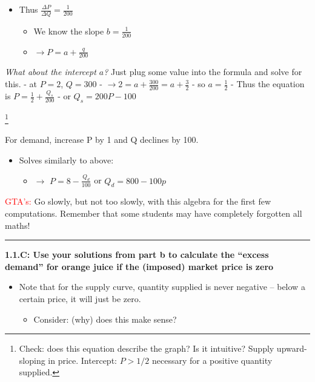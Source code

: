 \documentclass[]{article}
\providecommand{\tightlist}{%
  \setlength{\itemsep}{0pt}\setlength{\parskip}{0pt}}
\let\rmarkdownfootnote\footnote%
\def\footnote{\protect\rmarkdownfootnote}
\begin{document}
\begin{itemize}
\tightlist
\item
  Thus \(\frac{\Delta P}{\Delta Q} = \frac{1}{200}\)

  \begin{itemize}
  \tightlist
  \item
    We know the slope \(b=\frac{1}{200}\)
  \item
    \(\rightarrow P = a + \frac{q}{200}\)
  \end{itemize}
\end{itemize}

\emph{What about the intercept \(a\)?} Just plug some value into the
formula and solve for this. - at \(P=2\), \(Q=300\) -
\(\rightarrow 2 = a + \frac{300}{200} = a + \frac{3}{2}\) - so
\(a = \frac{1}{2}\) - Thus the equation is
\(P = \frac{1}{2} + \frac{Q_s}{200}\) - or \(Q_s=200P-100\)

\footnote{Check: does this equation describe the graph? Is it intuitive? Supply upward-sloping in price. Intercept: $P>1/2$ necessary for a positive quantity supplied.}

For demand, increase P by 1 and Q declines by 100.

\begin{itemize}
\tightlist
\item
  Solves similarly to above:

  \begin{itemize}
  \tightlist
  \item
    \(\rightarrow\) \(P=8-\frac{Q_d}{100}\) or \(Q_d=800-100p\)
  \end{itemize}
\end{itemize}

\textcolor{red}{GTA's:} Go slowly, but not too slowly, with this algebra
for the first few computations. Remember that some students may have
completely forgotten all maths!

\begin{center}\rule{0.5\linewidth}{\linethickness}\end{center}

\textbf{1.1.C: Use your solutions from part b to calculate the ``excess
demand'' for orange juice if the (imposed) market price is zero}

\begin{itemize}
\tightlist
\item
  Note that for the supply curve, quantity supplied is never negative --
  below a certain price, it will just be zero.

  \begin{itemize}
  \tightlist
  \item
    Consider: (why) does this make sense?
  \end{itemize}
\end{itemize}
\end{document}
